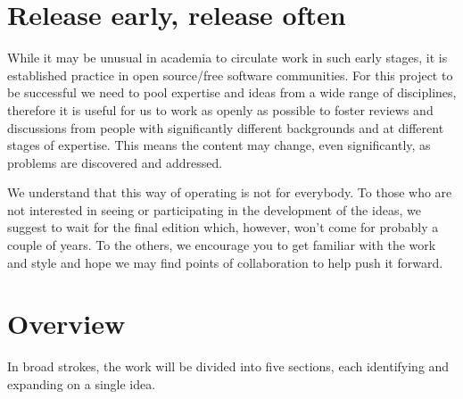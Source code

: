 \documentclass[11pt,letterpaper,fleqn]{memoir} %
\begin{document}
\section*{Release early, release often}

While it may be unusual in academia to circulate work in such early stages, it is established practice in open source/free software communities. For this project to be successful we need to pool expertise and ideas from a wide range of disciplines, therefore it is useful for us to work as openly as possible to foster reviews and discussions from people with significantly different backgrounds and at different stages of expertise. This means the content may change, even significantly, as problems are discovered and addressed.

We understand that this way of operating is not for everybody. To those who are not interested in seeing or participating in the development of the ideas, we suggest to wait for the final edition which, however, won't come for probably a couple of years. To the others, we encourage you to get familiar with the work and style and hope we may find points of collaboration to help push it forward. 

\section*{Overview}

In broad strokes, the work will be divided into five sections, each identifying and expanding on a single idea.
\end{document}
